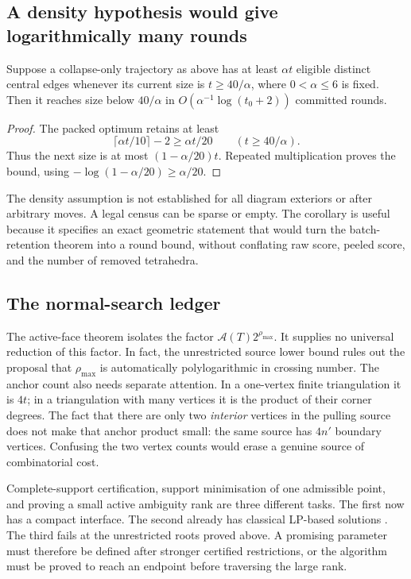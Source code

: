 \subsection{A density hypothesis would give logarithmically many rounds}

\begin{corollary}
\label{cor:dense-progress}
Suppose a collapse-only trajectory as above has at least $\alpha t$
eligible distinct central edges whenever its current size is $t\ge40/\alpha$,
where $0<\alpha\le6$ is fixed. Then it reaches size below $40/\alpha$ in
$O(\alpha^{-1}\log(t_0+2))$ committed rounds.
\end{corollary}
\begin{proof}
The packed optimum retains at least
\[
 \lceil\alpha t/10\rceil-2\ge\alpha t/20
 \qquad(t\ge40/\alpha).
\]
Thus the next size is at most $(1-\alpha/20)t$. Repeated multiplication
proves the bound, using $-\log(1-\alpha/20)\ge\alpha/20$.
\end{proof}

The density assumption is not established for all diagram exteriors or
after arbitrary moves. A legal census can be sparse or empty. The corollary
is useful because it specifies an exact geometric statement that would
turn the batch-retention theorem into a round bound, without conflating
raw score, peeled score, and the number of removed tetrahedra.

\subsection{The normal-search ledger}

The active-face theorem isolates the factor
$\mathcal A(T)2^{\rho_{\max}}$. It supplies no universal reduction of this
factor. In fact, the unrestricted source lower bound rules out the proposal
that $\rho_{\max}$ is automatically polylogarithmic in crossing number.
The anchor count also needs separate attention. In a one-vertex finite
triangulation it is $4t$; in a triangulation with many vertices it is the
product of their corner degrees. The fact that there are only two
\emph{interior} vertices in the pulling source does not make that anchor
product small: the same source has $4n'$ boundary vertices. Confusing the
two vertex counts would erase a genuine source of combinatorial cost.

Complete-support certification, support minimisation of one admissible
point, and proving a small active ambiguity rank are three different
tasks. The first now has a compact interface. The second already has
classical LP-based solutions \cite{BurtonOzlen}. The third fails at the
unrestricted roots proved above. A promising parameter must therefore be
defined after stronger certified restrictions, or the algorithm must be
proved to reach an endpoint before traversing the large rank.

